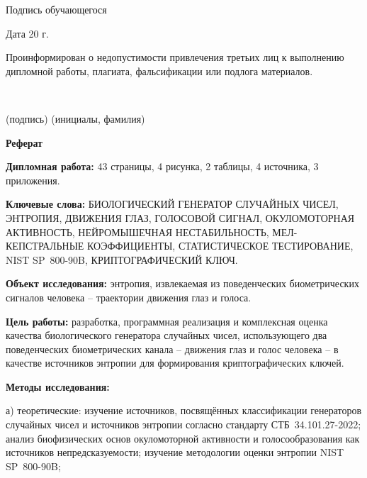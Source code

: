 \documentclass[14pt, a4paper]{extreport}
\begin{document}
\noindent Подпись обучающегося \underline{\hspace{6cm}}
 
\noindent Дата\underline{\hspace{3cm}} 20\underline{\hspace{0.5cm}} г.
 
\vspace{1.5cm}
\newpage
\thispagestyle{empty}
\noindent Проинформирован о недопустимости привлечения третьих лиц к выполнению дипломной работы, плагиата, фальсификации или подлога материалов.
 
\vspace{0.8cm}
 
\noindent\underline{\hspace{3cm}} \quad \underline{\hspace{5cm}}\\
{\hspace{1cm}\footnotesize (подпись) \hspace{1.5cm} (инициалы, фамилия)\par}
\setcounter{page}{1}   %
\renewcommand{\contentsname}{\centering ОГЛАВЛЕНИЕ}
\tableofcontents
\newpage
\begin{center}{\bf \Large Реферат}\end{center}
 
\textbf{Дипломная работа:} 43 страницы, 4 рисунка, 2 таблицы, 4 источника, 3 приложения.
 
\textbf{Ключевые слова:} БИОЛОГИЧЕСКИЙ ГЕНЕРАТОР СЛУЧАЙНЫХ ЧИСЕЛ, ЭНТРОПИЯ,
ДВИЖЕНИЯ ГЛАЗ, ГОЛОСОВОЙ СИГНАЛ, ОКУЛОМОТОРНАЯ АКТИВНОСТЬ, НЕЙРОМЫШЕЧНАЯ
НЕСТАБИЛЬНОСТЬ, МЕЛ-КЕПСТРАЛЬНЫЕ КОЭФФИЦИЕНТЫ, СТАТИСТИЧЕСКОЕ ТЕСТИРОВАНИЕ,
NIST SP~800-90B, КРИПТОГРАФИЧЕСКИЙ КЛЮЧ.
 
\textbf{Объект исследования:} энтропия, извлекаемая из поведенческих
биометрических сигналов человека -- траектории движения глаз и голоса.
 
\textbf{Цель работы:} разработка, программная реализация и комплексная оценка
качества биологического генератора случайных чисел, использующего два
поведенческих биометрических канала -- движения глаз и голос человека --
в качестве источников энтропии для формирования криптографических ключей.
 
\textbf{Методы исследования:}
 
а) теоретические: изучение источников, посвящённых классификации генераторов
случайных чисел и источников энтропии согласно стандарту СТБ~34.101.27-2022;
анализ биофизических основ окуломоторной активности и голосообразования как
источников непредсказуемости; изучение методологии оценки энтропии
NIST SP~800-90B;
 
\end{document}
